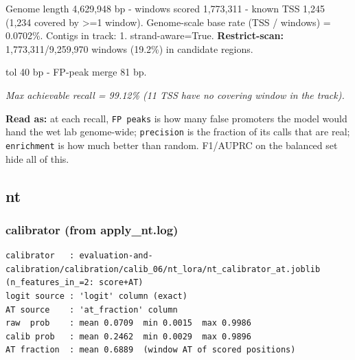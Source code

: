 \documentclass[10pt]{article}
\begin{document}
Genome length 4,629,948 bp - windows scored 1,773,311 - known TSS 1,245 (1,234 covered by >=1 window). Genome-scale base rate (TSS / windows) = 0.0702\%. Contigs in track: 1. strand-aware=True. \textbf{Restrict-scan:} 1,773,311/9,259,970 windows (19.2\%) in candidate regions.

tol 40 bp - FP-peak merge 81 bp.

\begin{center}
\end{center}

{\itshape Max achievable recall = 99.12\% (11 TSS have no covering window in the track).}

\textbf{Read as:} at each recall, \texttt{FP peaks} is how many false promoters the model would hand the wet lab genome-wide; \texttt{precision} is the fraction of its calls that are real; \texttt{enrichment} is how much better than random. F1/AUPRC on the balanced set hide all of this.

\subsection*{nt}

\subsubsection*{calibrator (from apply\_nt.log)}
\begin{verbatim}
calibrator   : evaluation-and-calibration/calibration/calib_06/nt_lora/nt_calibrator_at.joblib  (n_features_in_=2: score+AT)
logit source : 'logit' column (exact)
AT source    : 'at_fraction' column
raw  prob    : mean 0.0709  min 0.0015  max 0.9986
calib prob   : mean 0.2462  min 0.0029  max 0.9896
AT fraction  : mean 0.6889  (window AT of scored positions)
\end{verbatim}
\end{document}
